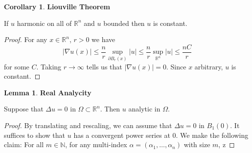 \documentclass[12pt, a4paper]{article}
\theoremstyle{definition}
\newtheorem{lemma}{Lemma}
\newtheorem{cor}{Corollary}
\newcommand{\N}{\mathbb{N}}                           %
\newcommand{\R}{\mathbb{R}}                           %
\newcommand{\bd}{\partial}
\newcommand{\grad}{\nabla}
\begin{document}
\begin{tcolorbox}
\begin{cor}
	\textbf{Liouville Theorem}
\end{cor}
If $u$ harmonic on all of $\R^n$ and $u$ bounded then $u$ is constant. 
\begin{proof}
For any $x\in \R^n$, $r>0$ we have
	$$ |\grad u(x)| \leq \frac{ n }{ r }\sup_{\bd B_r(x)} |u| \leq \frac{ n }{ r } \sup_{\R^n} |u| \leq \frac{ nC }{ r } $$
for some $C$. Taking $r\to \infty$ tells us that $|\grad u(x)| = 0$. Since $x$ arbitrary, $u$ is constant. 
\end{proof}
\end{tcolorbox}
\begin{tcolorbox}
\begin{lemma}
	\textbf{Real Analycity}
\end{lemma}
Suppose that $\Delta u = 0$ in $\Omega \subset \R^n$. Then $u$ analytic in $\Omega$. 
\begin{proof}
	By translating and rescaling, we can assume that $\Delta u = 0$ in $B_1(0)$. It suffices to show that $u$ has a convergent power series at $0$.
We make the following claim: 
	For all $m \in \N$, for any multi-index $\alpha = (\alpha_1, \dots, \alpha_n)$ with size $m$, z
\end{proof}
\end{tcolorbox}
\end{document}
